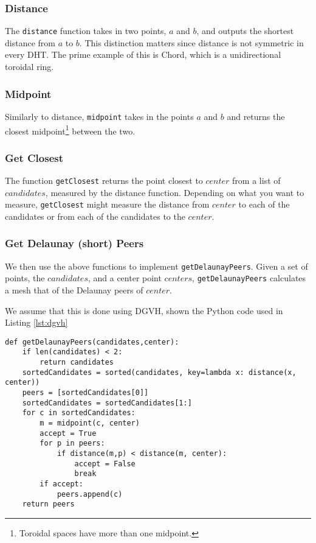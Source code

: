 \documentclass[11pt,conference]{IEEEtran}
\begin{document}
\subsubsection{Distance}
The \texttt{distance} function takes in two points, $a$ and $b$, and outputs the shortest distance from $a$ to $b$.
This distinction matters since distance is not symmetric in every DHT.
The prime example of this is Chord, which is a unidirectional toroidal ring.


\subsubsection{Midpoint}

Similarly to distance, \texttt{midpoint} takes in the points $ a $ and $ b $ and returns the closest midpoint\footnote{Toroidal spaces have more than one midpoint.} between the two.
\subsubsection{Get Closest}
The function \texttt{getClosest} returns the point closest to $ center$ from a list of $ candidates$, measured by the distance function.
Depending on what you want to measure, \texttt{getClosest} might measure the distance from $ center$ to each of the candidates or from each of the candidates to the $ center$.

\subsubsection{Get Delaunay (short) Peers}
We then use the above functions to implement  \texttt{getDelaunayPeers}.
Given a set of points, the $ candidates$, and a center point $ centers$, \texttt{getDelaunayPeers} calculates a mesh that of the Delaunay peers of $ center$.

We assume that this is done using DGVH, shown the Python code used
in Listing \ref{lst:dgvh}

\begin{lstlisting}[basicstyle=\footnotesize\ttfamily,  breaklines=true, caption={\texttt{getDelaunayPeers()}}, label={lst:dgvh}, frame=single] 
def getDelaunayPeers(candidates,center):    
    if len(candidates) < 2:
	    return candidates
    sortedCandidates = sorted(candidates, key=lambda x: distance(x, center))
    peers = [sortedCandidates[0]] 
    sortedCandidates = sortedCandidates[1:]
    for c in sortedCandidates:
	    m = midpoint(c, center)
	    accept = True
	    for p in peers:
		    if distance(m,p) < distance(m, center):  
			    accept = False
			    break
	    if accept:
		    peers.append(c)
    return peers
\end{lstlisting}
\end{document}
